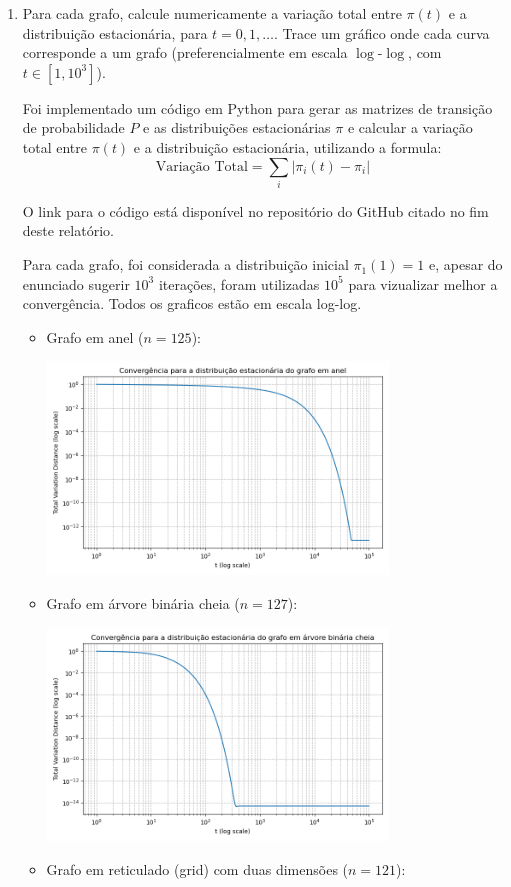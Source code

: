 \begin{enumerate}
    \item Para cada grafo, calcule numericamente a variação total entre $\pi(t)$ e a distribuição estacionária, para $t = 0, 1, \dots$. Trace um gráfico onde cada curva corresponde a um grafo (preferencialmente em escala $\log$-$\log$, com $t \in [1, 10^3]$).
    \begin{resposta}
        Foi implementado um código em Python para gerar as matrizes de transição de probabilidade $P$ e as distribuições estacionárias $\pi$ e calcular a variação total entre $\pi(t)$ e a distribuição estacionária, utilizando a formula:
        $$\text{Variação Total} = \sum_i |\pi_i(t) - \pi_i|$$

        O link para o código está disponível no repositório do GitHub citado no fim deste relatório.

        Para cada grafo, foi considerada a distribuição inicial $\pi_1(1)=1$ e, apesar do enunciado sugerir $10^3$ iterações, foram utilizadas $10^5$ para vizualizar melhor a convergência. Todos os graficos estão em escala log-log.

        \begin{itemize}
            \item Grafo em anel ($n = 125$):
            
            \includegraphics[width=0.75\textwidth]{fig/q2_anel.png}
            \item Grafo em árvore binária cheia ($n = 127$):
            
            \includegraphics[width=0.75\textwidth]{fig/q2_arvore.png}
            \item Grafo em reticulado (grid) com duas dimensões ($n = 121$):
            

\end{itemize}
\end{resposta}
\end{enumerate}
